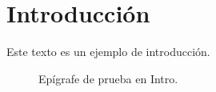   \section{Introducción}
    Este texto es un ejemplo de introducción.
    
    \begin{figure}[htb]
        \centering
        \caption{Epígrafe de prueba en Intro.}
        \label{fig:IntroImage}
    \end{figure}
